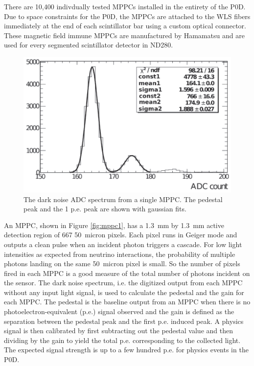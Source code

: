 There are 10,400 indivdually tested MPPCs installed in the entirety
of the P0D. Due to space constraints for the P0D, the MPPCs are
attached to the WLS fibers immediately at the end of each scintillator
bar using a custom optical connector. These magnetic field immune
MPPCs are manufactured by Hamamatsu and are used for every segmented
scintillator detector in ND280.

\begin{figure}
\begin{center}
\includegraphics[width=6in]{./Figures/pedestal.png}
\end{center}
\caption{The dark noise ADC spectrum from a single MPPC. The pedestal
  peak and the 1 p.e. peak are shown with gaussian fits.}
\label{fig:pedestal}
\end{figure}

An MPPC, shown in Figure \ref{fig:mppc1}, has a 1.3~mm by 1.3~mm active detection region of 667 50~micron
pixels. Each pixel runs in Geiger mode and outputs a clean pulse when
an incident photon triggers a cascade. For low light intensities as
expected from neutrino interactions, the probability of multiple
photons landing on the same 50~micron pixel is small. So the number of
pixels fired in each MPPC is a good measure of the total number of
photons incident on the sensor. The dark noise spectrum, i.e. the digitized output from each MPPC
without any input light signal, is used to calculate the pedestal and
the gain for each MPPC. The pedestal is the baseline output from an MPPC when
there is no photoelectron-equivalent (p.e.) signal observed and the gain is
defined as the separation between the pedestal peak and the first
p.e. induced peak. A physics signal is then calibrated by first
subtracting out the pedestal value and then dividing by the gain to
yield the total p.e. corresponding to the collected light. The
expected signal strength is up to a few hundred p.e. for physics
events in the P0D. 

